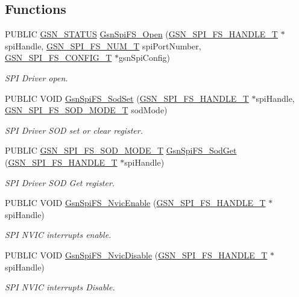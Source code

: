 \subsection*{Functions}
\begin{DoxyCompactItemize}
\item 
PUBLIC \hyperlink{a00660_gada5951904ac6110b1fa95e51a9ddc217}{GSN\_\-STATUS} \hyperlink{a00655_ga08c9eaf99c6d82d2dc1ca82541705714}{GsnSpiFS\_\-Open} (\hyperlink{a00234}{GSN\_\-SPI\_\-FS\_\-HANDLE\_\-T} $\ast$spiHandle, \hyperlink{a00589_af1ec0abe9693a9ef0c69dc5696f322b3}{GSN\_\-SPI\_\-FS\_\-NUM\_\-T} spiPortNumber, \hyperlink{a00233}{GSN\_\-SPI\_\-FS\_\-CONFIG\_\-T} $\ast$gsnSpiConfig)
\begin{DoxyCompactList}\small\item\em SPI Driver open. \end{DoxyCompactList}\item 
PUBLIC VOID \hyperlink{a00655_ga89264f326bcee7b92fa19c8982741114}{GsnSpiFS\_\-SodSet} (\hyperlink{a00234}{GSN\_\-SPI\_\-FS\_\-HANDLE\_\-T} $\ast$spiHandle, \hyperlink{a00655_gaa0f62d38ee68880a4e3bb673a05d293d}{GSN\_\-SPI\_\-FS\_\-SOD\_\-MODE\_\-T} sodMode)
\begin{DoxyCompactList}\small\item\em SPI Driver SOD set or clear register. \end{DoxyCompactList}\item 
PUBLIC \hyperlink{a00655_gaa0f62d38ee68880a4e3bb673a05d293d}{GSN\_\-SPI\_\-FS\_\-SOD\_\-MODE\_\-T} \hyperlink{a00655_ga8f68d2d6a945c9e7237cdc0d215d5095}{GsnSpiFS\_\-SodGet} (\hyperlink{a00234}{GSN\_\-SPI\_\-FS\_\-HANDLE\_\-T} $\ast$spiHandle)
\begin{DoxyCompactList}\small\item\em SPI Driver SOD Get register. \end{DoxyCompactList}\item 
PUBLIC VOID \hyperlink{a00655_gaf9dc341501508d7843da0e06f776c1c2}{GsnSpiFS\_\-NvicEnable} (\hyperlink{a00234}{GSN\_\-SPI\_\-FS\_\-HANDLE\_\-T} $\ast$spiHandle)
\begin{DoxyCompactList}\small\item\em SPI NVIC interrupts enable. \end{DoxyCompactList}\item 
PUBLIC VOID \hyperlink{a00655_ga03fb48e9f6139472b3018cd940fc9b10}{GsnSpiFS\_\-NvicDisable} (\hyperlink{a00234}{GSN\_\-SPI\_\-FS\_\-HANDLE\_\-T} $\ast$spiHandle)
\begin{DoxyCompactList}\small\item\em SPI NVIC interrupts Disable. \end{DoxyCompactList}\item 

\end{DoxyCompactItemize}
